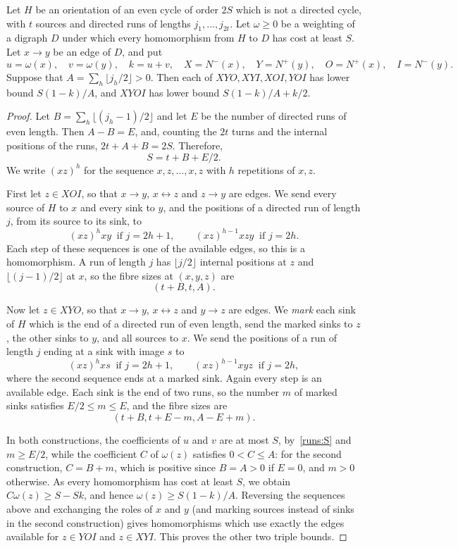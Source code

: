 \begin{lemma}
\label{geom368:unrestricted-folds}
Let $H$ be an orientation of an even cycle of order $2S$ which is not a directed cycle,
with $t$ sources and directed runs of lengths $j_1,\ldots,j_{2t}$.
Let $\omega\ge0$ be a weighting of a digraph $D$ under which every homomorphism
from $H$ to $D$ has cost at least $S$. Let $x\to y$ be an edge of $D$, and put
\[
 u=\omega(x),\quad v=\omega(y),\quad k=u+v,
 \quad X=N^-(x),\quad Y=N^+(y),\quad O=N^+(x),\quad I=N^-(y).
\]
Suppose that $A=\sum_h\lfloor j_h/2\rfloor>0$.
Then each of $XYO,XYI,XOI,YOI$ has lower bound
$S(1-k)/A$, and $XYOI$ has lower bound $S(1-k)/A+k/2$.
\end{lemma}
\begin{proof}
Let $B=\sum_h\lfloor(j_h-1)/2\rfloor$ and let $E$ be the number of directed runs of even length. Then $A-B=E$, and, counting the $2t$ turns and the internal positions of the runs, $2t+A+B=2S$. Therefore,
\begin{equation}\label{runs:S}
S=t+B+E/2.
\end{equation}
We write $(xz)^h$ for the sequence $x,z,\ldots,x,z$ with $h$ repetitions of $x,z$.

First let $z\in XOI$, so that $x\to y$, $x\leftrightarrow z$ and $z\to y$ are edges. We send every source of $H$ to $x$ and every sink to $y$, and the positions of a directed run of length $j$, from its source to its sink, to
\[
 (xz)^hxy\ \text{ if }j=2h+1,\qquad (xz)^{h-1}xzy\ \text{ if }j=2h.
\]
Each step of these sequences is one of the available edges, so this is a homomorphism. A run of length $j$ has $\lfloor j/2\rfloor$ internal positions at $z$ and $\lfloor (j-1)/2\rfloor$ at $x$, so the fibre sizes at $(x,y,z)$ are
\[
 (t+B,t,A).
\]

Now let $z\in XYO$, so that $x\to y$, $x\leftrightarrow z$ and $y\to z$ are edges. We \emph{mark} each sink of $H$ which is the end of a directed run of even length, send the marked sinks to $z$, the other sinks to $y$, and all sources to $x$. We send the positions of a run of length $j$ ending at a sink with image $s$ to
\[
 (xz)^hxs\ \text{ if }j=2h+1,\qquad (xz)^{h-1}xyz\ \text{ if }j=2h,
\]
where the second sequence ends at a marked sink. Again every step is an available edge. Each sink is the end of two runs, so the number $m$ of marked sinks satisfies $E/2\le m\le E$, and the fibre sizes are
\[
 (t+B,t+E-m,A-E+m).
\]

In both constructions, the coefficients of $u$ and $v$ are at most $S$, by~\eqref{runs:S} and $m\ge E/2$, while the coefficient $C$ of $\omega(z)$ satisfies $0<C\le A$: for the second construction, $C=B+m$, which is positive since $B=A>0$ if $E=0$, and $m>0$ otherwise.
As every homomorphism has cost at least $S$, we obtain $C\omega(z)\ge S-Sk$, and hence $\omega(z)\ge S(1-k)/A$.
Reversing the sequences above and exchanging the roles of $x$ and $y$ (and marking sources instead of sinks in the second construction) gives homomorphisms which use exactly the edges available for $z\in YOI$ and $z\in XYI$. This proves the other two triple bounds.


\end{proof}
